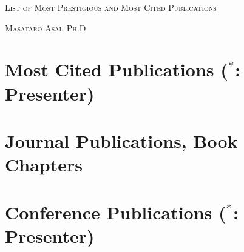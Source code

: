 \documentclass[letterpaper,11pt]{article}
\begin{document}
\pagestyle{empty}

\begin{center}
{\huge\textsc{List of Most Prestigious and Most Cited Publications}}
\vspace{0.7\baselineskip}

{\Large\textsc{Masataro Asai, Ph.D}}
\vspace{0.5\baselineskip}

\small

\end{center}

\section{Most Cited Publications ($^*$: Presenter)}

\nocite{Asai2018}
\putbib

\section{Journal Publications, Book Chapters}

\nocite{Asai2022}
\nocite{Asai2017}
\putbib

\section{Conference Publications ($^*$: Presenter)}

\nocite{Asai2022b}
\nocite{Asai2022c}
\nocite{Asai2020}
\nocite{Asai2019a}
\nocite{Asai2019b}
\nocite{Asai2018}
\nocite{Asai2017e}
\nocite{Asai2017b}
\nocite{Asai2016b}
\nocite{Asai2016}
\nocite{Asai2015}
\nocite{Asai2014}
\putbib
\end{document}
